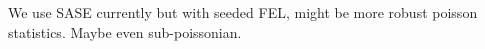 We use SASE currently but with seeded FEL, might be more robust poisson statistics. Maybe even sub-poissonian. 